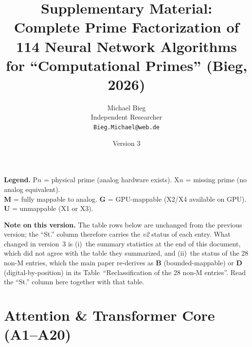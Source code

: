 \documentclass[10pt]{article}
\title{Supplementary Material:\\Complete Prime Factorization of 114 Neural Network Algorithms\\for ``Computational Primes'' (Bieg, 2026)}
\author{Michael Bieg\\Independent Researcher\\\texttt{Bieg.Michael@web.de}}
\date{Version 3}
\begin{document}
\maketitle

\noindent\textbf{Legend.} P$n$ = physical prime (analog hardware exists). X$n$ = missing prime (no analog equivalent).\\
\textbf{M} = fully mappable to analog. \textbf{G} = GPU-mappable (X2/X4 available on GPU). \textbf{U} = unmappable (X1 or X3).

\medskip
\noindent\textbf{Note on this version.} The table rows below are unchanged from the
previous version; the ``St.'' column therefore carries the \emph{v2} status of each
entry. What changed in version~3 is (i)~the summary statistics at the end of this
document, which did not agree with the table they summarized, and (ii)~the status
of the 28 non-M entries, which the main paper re-derives as \textbf{B}
(bounded-mappable) or \textbf{D} (digital-by-position) in its Table~``Reclassification
of the 28 non-M entries''. Read the ``St.'' column here together with that table.

\section{Attention \& Transformer Core (A1--A20)}
\end{document}
